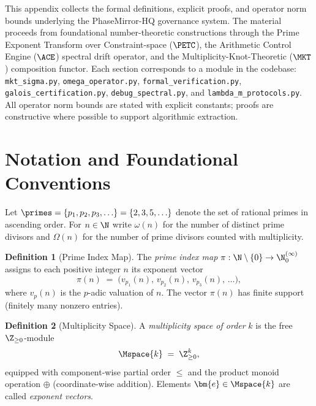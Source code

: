 \documentclass[12pt,letterpaper]{article}
\theoremstyle{definition}
\newtheorem{definition}{Definition}[section]
\theoremstyle{remark}
\begin{document}
\newpage

\appendix
This appendix collects the formal definitions, explicit proofs, and operator norm bounds underlying the PhaseMirror-HQ governance system.
The material proceeds from foundational number-theoretic constructions through
the Prime Exponent Transform over Constraint-space (\(\PETC\)), the
Arithmetic Control Engine (\(\ACE\)) spectral drift operator, and the
Multiplicity-Knot-Theoretic (\(\MKT\)) composition functor.
Each section corresponds to a module in the codebase:
\texttt{mkt\_sigma.py}, \texttt{omega\_operator.py},
\texttt{formal\_verification.py}, \texttt{galois\_certification.py},
\texttt{debug\_spectral.py}, and \texttt{lambda\_m\_protocols.py}.
All operator norm bounds are stated with explicit constants; proofs are
constructive where possible to support algorithmic extraction.

\section{Notation and Foundational Conventions}
\label{sec:notation}

Let \(\primes = \{p_1, p_2, p_3, \ldots\} = \{2, 3, 5, \ldots\}\) denote the
set of rational primes in ascending order.  For \(n \in \N\) write
\(\omega(n)\) for the number of distinct prime divisors and \(\Omega(n)\) for
the number of prime divisors counted with multiplicity.

\begin{definition}[Prime Index Map]
  \label{def:prime-index}
  The \emph{prime index map} \(\pi : \N \setminus \{0\} \to \N_0^{(\infty)}\)
  assigns to each positive integer \(n\) its exponent vector
  \[
    \pi(n) \;=\; \bigl(v_{p_1}(n),\, v_{p_2}(n),\, v_{p_3}(n),\,\ldots\bigr),
  \]
  where \(v_p(n)\) is the \(p\)-adic valuation of \(n\).  The vector
  \(\pi(n)\) has finite support (finitely many nonzero entries).
\end{definition}

\begin{definition}[Multiplicity Space]
  \label{def:mspace}
  A \emph{multiplicity space of order} \(k\) is the free \(\Z_{\ge 0}\)-module
  \[
    \Mspace{k} \;=\; \Z_{\ge 0}^k,
  \]
  equipped with component-wise partial order \(\le\) and the product monoid
  operation \(\oplus\) (coordinate-wise addition).  Elements
  \(\bm{e} \in \Mspace{k}\) are called \emph{exponent vectors}.
\end{definition}
\end{document}

